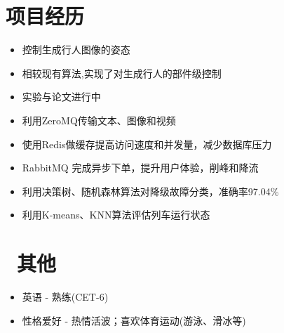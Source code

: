 \documentclass{resume}
\begin{document}
\section{项目经历}

\begin{itemize}[topsep = 0 pt, partopsep = 0pt]
  \item 控制生成行人图像的姿态
  \item 相较现有算法,实现了对生成行人的部件级控制
  \item 实验与论文进行中
\end{itemize}

\begin{itemize}[topsep = 0 pt, partopsep = 0pt]
  \item 利用ZeroMQ传输文本、图像和视频
\end{itemize}

\begin{itemize}[topsep = 0 pt, partopsep = 0pt]
  \item 使用Redis做缓存提高访问速度和并发量，减少数据库压力
  \item RabbitMQ 完成异步下单，提升用户体验，削峰和降流
\end{itemize}

\begin{itemize}[topsep = 0 pt, partopsep = 0pt]
  \item 利用决策树、随机森林算法对降级故障分类，准确率97.04$\%$
  \item 利用K-means、KNN算法评估列车运行状态
\end{itemize}

\section{\faInfo\ 其他}
\begin{itemize}[parsep=0.5ex]
  \item  英语 - 熟练(CET-6)
  \item  性格爱好 - 热情活波；喜欢体育运动(游泳、滑冰等)
\end{itemize}
\end{document}
